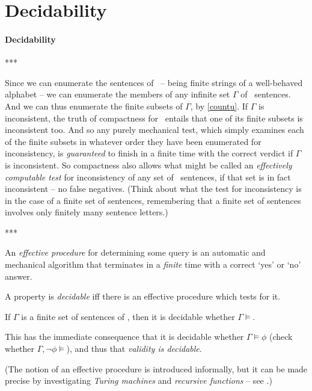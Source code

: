 \section{Decidability}\label{decide}
\paragraph{Decidability}





***

Since we can enumerate the sentences of \lone\ – being finite strings of a well-behaved alphabet – we can enumerate the members of any infinite set $\Gamma$ of \lone\ sentences. And we can thus enumerate the finite subsets of $\Gamma$, by \autoref{countu}. If $\Gamma$ is inconsistent, the truth of compactness for \lone\ entails that one of its finite subsets is inconsistent too. And so any purely mechanical test, which simply examines each of the finite subsets in whatever order they have been enumerated for inconsistency, is \emph{guaranteed} to finish in a finite time with the correct verdict if $\Gamma$ is inconsistent. So compactness also allows what might be called an \emph{effectively computable test} for inconsistency of any set of \lone\ sentences, if that set is in fact inconsistent – no false negatives. (Think about what the test for inconsistency is in the case of a finite set of sentences, remembering that a finite set of sentences involves only finitely many sentence letters.)


***




An \emph{effective procedure} for determining some query is an automatic and mechanical algorithm that terminates in a \emph{finite} time with a correct `yes' or `no' answer. 

A property is \emph{decidable} iff there is an effective procedure which tests for it.

\begin{theorem}
	If $\Gamma$ is a finite set of sentences of \lone, then it is decidable whether $\Gamma \vDash$.
\end{theorem}

This has the immediate consequence that it is decidable whether $\Gamma\vDash\phi$ (check whether $\Gamma,\neg\phi\vDash$), and thus that \emph{validity is decidable}.

(The notion of an effective procedure is introduced informally, but it can be made precise by investigating \emph{Turing machines} and  \emph{recursive functions} – see \citet[chs.\ 1--8]{bbjcomlo}.)

